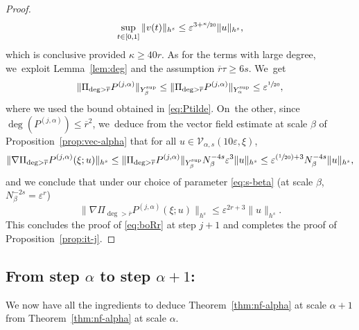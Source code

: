 \documentclass[10pt,a4paper]{amsart}
\newcommand{\Psfrac}[2]{(\sfrac{#1}{#2})}
\theoremstyle{plain}
\theoremstyle{definition}
\newcommand{\1}{\mathbf{1}}
\newcommand{\Ysup}[1]{Y_{#1}^{\mathrm{sup}}}
\let\epsilon\varepsilon
\begin{document}
\begin{proof}
\begin{align*}
\sup_{t\in[0,1]}\|v(t)\|_{h^{s}}
\leq\epsilon^{3+\sfrac{\kappa}{20}}\|u\|_{h^{s}},
\end{align*}
which is conclusive provided $\kappa\geq 40r$. As for the terms with large degree, we~exploit Lemma~\ref{lem:deg} and the assumption $\overline{r}\tau\geq 6s$. We~get
\[
\|
\Pi_{\deg>\overline{r}}P^{(j,\alpha)}\|_{\Ysup{\beta}}
\leq
\|\Pi_{\deg>\overline{r}}P^{(j,\alpha)}
\|_{\Ysup{\alpha}}
\leq
\epsilon^{\sfrac{1}{20}},
\]
where we used the bound obtained in \eqref{eq:Ptilde}. On~the other, since $\deg(P^{(j,\alpha)})\leq\overline{r}^{2}$, we~deduce from the vector field estimate at scale $\beta$ of Proposition~\ref{prop:vec-alpha} that for all $u\in\mathcal{V}_{\alpha,s}(10\epsilon,\xi)$,
\[
\|\nabla \Pi_{\deg>\overline{r}}P^{(j,\alpha)}(\xi;u)\|_{h^{s}}
\leq \|\Pi_{\deg>\overline{r}}P^{(j,\alpha)}\|_{\Ysup{\beta}}
N_{\beta}^{-4s}\epsilon^{3}\|u\|_{h^{s}}
\leq
\epsilon^{\Psfrac{1}{20}+3}N_{\beta}^{-4s}\|u\|_{h^{s}},
\]
and we conclude that under our choice of parameter \eqref{eq:s-beta} (at scale $\beta$, $N_{\beta}^{-2s}=\epsilon^{r}$)
\[
\|\nabla \Pi_{\deg>\overline{r}}P^{(j,\alpha)}(\xi;u)\|_{h^{s}}
\leq
\epsilon^{2r+3}\|u\|_{h^{s}}.
\]
This concludes the proof of \eqref{eq:boRr} at step $j+1$ and completes the proof of Proposition~\ref{prop:it-j}.
\end{proof}

\subsection{From step $\alpha$ to step $\alpha+1$:}
\label{sec:+1}
We now have all the ingredients to deduce Theorem~\ref{thm:nf-alpha} at scale $\alpha+1$ from Theorem~\ref{thm:nf-alpha} at scale $\alpha$.
\end{document}
